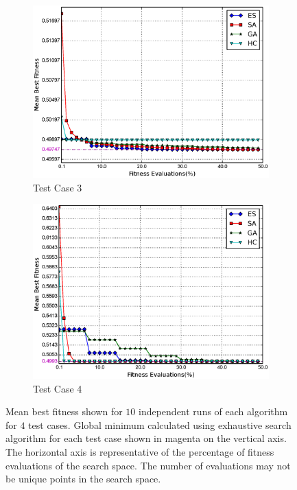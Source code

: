 \documentclass[conference]{IEEEtran}
\begin{document}
\begin{figure}
\begin{subfigure}{\columnwidth}
    \end{subfigure}\hfill\\
    \begin{subfigure}{\columnwidth}
        \includegraphics[width=\columnwidth]{FIG/tc3_mf.eps}%
        \caption{Test Case 3}%
        \label{fig:tc3_mf}%
    \end{subfigure}\hfill%
    \begin{subfigure}{\columnwidth}
        \includegraphics[width=\columnwidth]{FIG/tc4_mf.eps}%
        \caption{Test Case 4}%
        \label{fig:tc4_mf}%
    \end{subfigure}\hfill%
    \caption{Mean best fitness shown for $10$ independent runs of each algorithm for $4$ test cases. Global minimum calculated using exhaustive search algorithm for each test case shown in magenta on the vertical axis. The horizontal axis is representative of the percentage of fitness evaluations of the search space. The number of evaluations may not be unique points in the search space.}
\label{fig:tc_mf}
\end{figure}
 
\end{document}
